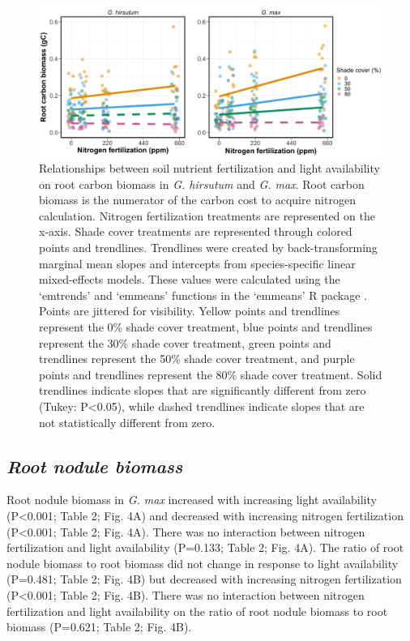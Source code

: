 \newpage
\begin{figure}
    \centering
    \includegraphics[width=\textwidth]{ch2_LxN_Greenhouse/figs/fig3_rootCarbon.png}
    \caption[Relationships between soil nitrogen fertilization and light availability on root carbon biomass in \textit{G. hirsutum} and \textit{G. max}]{Relationships between soil nutrient fertilization and light availability on root carbon biomass in \textit{G. hirsutum} and \textit{G. max}. Root carbon biomass is the numerator of the carbon cost to acquire nitrogen calculation. Nitrogen fertilization treatments are represented on the x-axis. Shade cover treatments are represented through colored points and trendlines. Trendlines were created by back-transforming marginal mean slopes and intercepts from species-specific linear mixed-effects models. These values were calculated using the ‘emtrends’ and ‘emmeans’ functions in the ‘emmeans’ R package . Points are jittered for visibility. Yellow points and trendlines represent the 0\% shade cover treatment, blue points and trendlines represent the 30\% shade cover treatment, green points and trendlines represent the 50\% shade cover treatment, and purple points and trendlines represent the 80\% shade cover treatment. Solid trendlines indicate slopes that are significantly different from zero (Tukey: P<0.05), while dashed trendlines indicate slopes that are not statistically different from zero.}
    \label{fig:my_figure2.3}
\end{figure}
\clearpage

\newpage
\subsection{\textit{Root nodule biomass}}
Root nodule biomass in \textit{G. max} increased with increasing light availability (P<0.001; Table 2; Fig. 4A) and decreased with increasing nitrogen fertilization (P<0.001; Table 2; Fig. 4A). There was no interaction between nitrogen fertilization and light availability (P=0.133; Table 2; Fig. 4A). The ratio of root nodule biomass to root biomass did not change in response to light availability (P=0.481; Table 2; Fig. 4B) but decreased with increasing nitrogen fertilization (P<0.001; Table 2; Fig. 4B). There was no interaction between nitrogen fertilization and light availability on the ratio of root nodule biomass to root biomass (P=0.621; Table 2; Fig. 4B).

